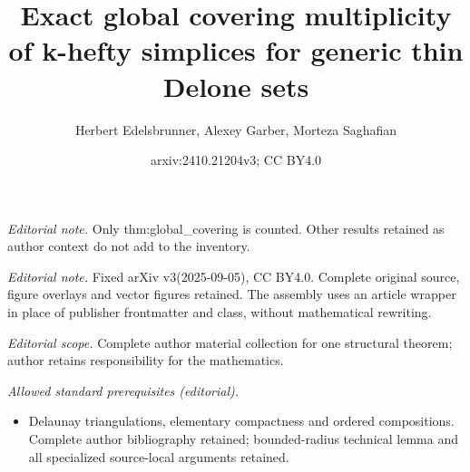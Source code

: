 \documentclass[10pt,a4paper]{article}
\title{Exact global covering multiplicity of k-hefty simplices for generic thin Delone sets}
\author{Herbert Edelsbrunner, Alexey Garber, Morteza Saghafian}
\date{arxiv:2410.21204v3; CC BY4.0}
\theoremstyle{plain}
\begin{document}
\maketitle
\noindent\textit{Editorial note.} Only thm:global\_covering is counted. Other results retained as author context do not add to the inventory.\par\medskip
\noindent\textit{Editorial note.} Fixed arXiv v3(2025-09-05), CC BY4.0. Complete original source, figure overlays and vector figures retained. The assembly uses an article wrapper in place of publisher frontmatter and class, without mathematical rewriting.\par\medskip
\noindent\textit{Editorial scope.} Complete author material collection for one structural theorem; author retains responsibility for the mathematics.\par\medskip
\noindent\textit{Allowed standard prerequisites (editorial).}\begin{itemize}
\item Delaunay triangulations, elementary compactness and ordered compositions. Complete author bibliography retained; bounded-radius technical lemma and all specialized source-local arguments retained.
\end{itemize}\medskip
\end{document}
